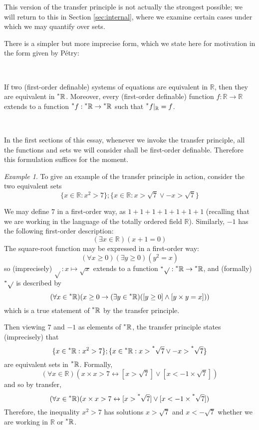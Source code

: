 \documentclass[11pt]{amsart}
\theoremstyle{remark}
\newtheorem*{example}{Example}
\newcommand{\hyp}[1][\mathbb{R}]{\prescript{*}{}{#1}}
\begin{document}
This version of the transfer principle is not actually the strongest possible; we will return to this in Section \ref{sec:internal}, where we examine certain cases under which we may quantify over sets.

There is a simpler but more imprecise form, which we state here for motivation in the form given by P\'{e}try:

\

\begin{defn} \label{defn:transferimprecise}
If two (first-order definable) systems of equations are equivalent in $\mathbb{R}$, then they are equivalent in $\hyp$.
Moreover, every (first-order definable) function $f: \mathbb{R} \to \mathbb{R}$ extends to a function $\hyp[f] : \hyp \to \hyp$ such that $\hyp[f] \vert_{\mathbb{R}} = f$.
\end{defn}

\

In the first sections of this essay, whenever we invoke the transfer principle, all the functions and sets we will consider shall be first-order definable.
Therefore this formulation suffices for the moment.

\begin{example}
To give an example of the transfer principle in action, consider the two equivalent sets $$\{x \in \mathbb{R}: x^2 > 7 \} ; \{x \in \mathbb{R}: x > \sqrt{7} \vee -x > \sqrt{7} \}$$

We may define $7$ in a first-order way, as $1+1+1+1+1+1+1$ (recalling that we are working in the language of the totally ordered field $\mathbb{R}$).
Similarly, $-1$ has the following first-order description: $$(\exists x \in \mathbb{R})(x+1 = 0)$$
The square-root function may be expressed in a first-order way: $$(\forall x \geq 0) (\exists y \geq 0)(y^2 = x)$$ so (imprecisely) $\sqrt{}: x \mapsto \sqrt{x}$ extends to a function $\hyp[\sqrt{}] : \hyp \to \hyp$, and (formally) $\hyp[\sqrt{}]$ is described by $$(\forall x \in \hyp)(x \geq 0 \rightarrow (\exists y \in \hyp)([y \geq 0] \wedge [y \times y = x]))$$
which is a true statement of $\hyp$ by the transfer principle.

Then viewing $7$ and $-1$ as elements of $\hyp$, the transfer principle states (imprecisely) that $$\{x \in \hyp: x^2 > 7\}; \{ x \in \hyp: x > \hyp[\sqrt{7}] \vee -x > \hyp[\sqrt{7}] \}$$ are equivalent sets in $\hyp$.
Formally, $$(\forall x \in \mathbb{R})(x \times x > 7 \leftrightarrow [x > \sqrt{7}] \vee [x < -1 \times \sqrt{7}])$$
and so by transfer, $$(\forall x \in \hyp)(x \times x > 7 \leftrightarrow [x > \hyp[\sqrt{7}]] \vee [x < -1 \times \hyp[\sqrt{7}]] )$$
Therefore, the inequality $x^2 > 7$ has solutions $x > \sqrt{7}$ and $x < -\sqrt{7}$ whether we are working in $\mathbb{R}$ or $\hyp$.
\end{example}
\end{document}
